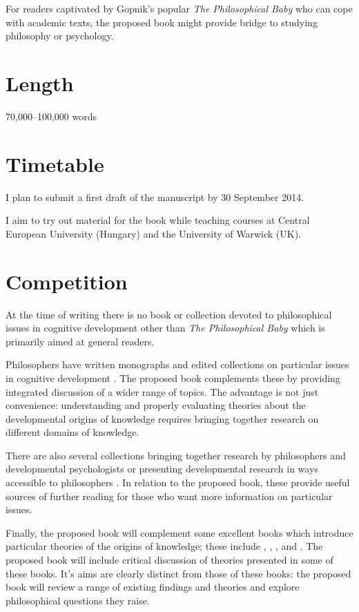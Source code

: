 \documentclass[12pt,\papersize]{extarticle}
\begin{document}
For readers captivated by Gopnik's popular \textit{The Philosophical Baby} \citep{gopnik:2009_philosophical} who can cope with academic texts, the proposed book might provide bridge to studying philosophy or psychology.



\section{Length}
70,000--100,000 words


\section{Timetable}
I plan to submit a first draft of the manuscript by 30 September 2014.  

I aim to try out material for the book while teaching courses at  Central European University (Hungary) and the University of Warwick (UK).



\section{Competition}
At the time of writing there is no book or collection devoted to philosophical issues in cognitive development other than \textit{The Philosophical Baby} \citep{gopnik:2009_philosophical} which is primarily aimed at general readers.

Philosophers have written monographs and edited collections on particular issues in cognitive development \citep[e.g.][]{Bermudez:2003dj,carruthers:1996_theories}.  
The proposed book complements these by providing integrated discussion of a wider range of topics. 
The advantage is not just convenience: understanding and properly evaluating theories about the developmental origins of knowledge requires bringing together research on different domains of knowledge.

There are also several collections bringing together research by philosophers and developmental psychologists or presenting developmental research in ways accessible to philosophers 
\citep[e.g.][]{Whiten:1991qn,hirschfeld:1994_mapping,carruthers:2005_innate_structure,carruthers:2006_innate_culture,hoerl:2011_understanding}.
In relation to the proposed book, these provide useful sources of further reading for those who want more information on particular issues.

Finally, the proposed book will complement some excellent books which introduce particular theories of the origins of knowledge; these include 
	\citet{Elman:1996zd},
	\citet{Gopnik:1997xq},
	\citet{Tomasello:1999xz},
	and
	\citet{carey:2009_origin}.
The proposed book will include critical discussion of theories presented in some of these  books.  
It's aims are clearly distinct from those of these books: the proposed book will review a range of existing findings and theories and explore philosophical questions they raise.  
\end{document}
